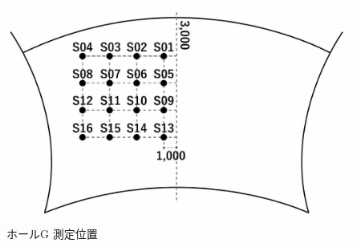 \documentclass[11pt,a4j]{jreport}
\begin{document}
\begin{figure}[H]
\begin{minipage}{0.5\textwidth}
    \includegraphics[width=.8\linewidth]{images/measuredHalls/resized/flat_g.jpg}
    \\ホールG 測定位置
  \end{minipage}%
  \begin{minipage}{.5\linewidth} %
    \raggedleft

\end{minipage}
\end{figure}
\end{document}
